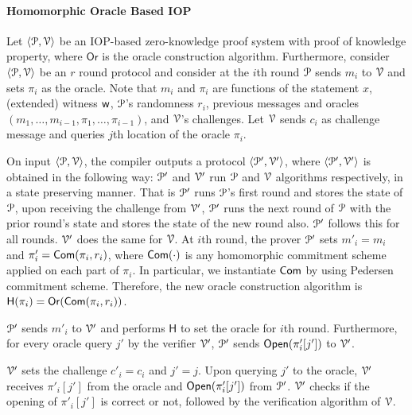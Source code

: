 \paragraph*{Homomorphic Oracle Based IOP} Let $\langle \mathcal{P}, \mathcal{V} \rangle$ be an IOP-based zero-knowledge proof system with proof of knowledge property, where $\mathsf{Or}$ is the oracle construction algorithm. 
Furthermore, consider $\langle \mathcal{P}, \mathcal{V} \rangle$ be an $r$ round protocol and consider at the $i$th round $\mathcal{P}$ sends $m_i$ to $\mathcal{V}$ and sets $\pi_i$ as the oracle. Note that $m_i$ and $\pi_i$ are functions of the statement $x$, (extended) witness $\mathsf{w}$, $\mathcal{P}$'s randomness $r_i$, previous messages and oracles $(m_1, \ldots, m_{i-1}, \pi_1, \ldots, \pi_{i-1})$, and $\mathcal{V}$'s challenges.
Let $\mathcal{V}$ sends $c_i$ as challenge message and queries $j$th location of the oracle $\pi_i$.

On input $\langle \mathcal{P}, \mathcal{V} \rangle$, the compiler outputs a protocol $\langle \mathcal{P}', \mathcal{V}' \rangle$, where $\langle \mathcal{P}', \mathcal{V}' \rangle$ is obtained in the following way: $\mathcal{P}'$ and $\mathcal{V}'$ run $\mathcal{P}$ and $\mathcal{V}$ algorithms respectively, in a state preserving manner. That is $\mathcal{P}'$ runs $\mathcal{P}$'s first round and stores the state of $\mathcal{P}$, upon receiving the challenge from $\mathcal{V}'$, $\mathcal{P}'$ runs the next round of $\mathcal{P}$ with the prior round's state and stores the state of the new round also. $\mathcal{P}'$ follows this for all rounds. $\mathcal{V}'$ does the same for $\mathcal{V}$. 
At $i$th round, the prover $\mathcal{P}'$ sets $m'_i = m_i$ and $\pi'_i = \mathsf{Com}(\pi_i, r_i)$, where $\mathsf{Com}(\cdot)$ is any homomorphic commitment scheme applied on each part of $\pi_i$. In particular, we instantiate $\mathsf{Com}$ by using Pedersen commitment scheme. Therefore, the new oracle construction algorithm is $\mathsf{H}(\pi_i) = \mathsf{Or}(\mathsf{Com}(\pi_i, r_i))$.

$\mathcal{P}'$ sends $m'_i$ to $\mathcal{V}'$ and performs $\mathsf{H}$ to set the oracle for $i$th round. Furthermore, for every oracle query $j'$ by the verifier $\mathcal{V}'$, $\mathcal{P}'$ sends $\mathsf{Open}(\pi'_i[j'])$ to $\mathcal{V}'$.

$\mathcal{V}'$ sets the challenge $c'_i = c_i$ and $j' = j$. Upon querying $j'$ to the oracle, $\mathcal{V}'$ receives $\pi'_i[j']$ from the oracle and $\mathsf{Open}(\pi'_i[j'])$ from $\mathcal{P}'$. $\mathcal{V}'$ checks if the opening of $\pi'_i[j']$ is correct or not, followed by the verification algorithm of $\mathcal{V}$. 

